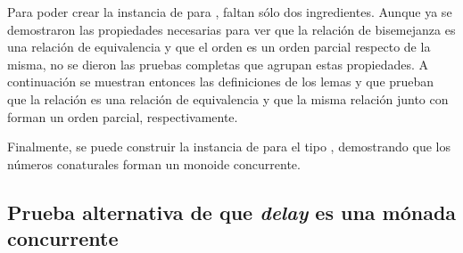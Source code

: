 Para poder crear la instancia de  para , faltan sólo dos ingredientes. Aunque ya se demostraron las propiedades necesarias para ver que la relación de bisemejanza es una relación de equivalencia y que el orden es un orden parcial respecto de la misma, no se dieron las pruebas completas que agrupan estas propiedades. A continuación se muestran entonces las definiciones de los lemas  y  que prueban que la relación \AgdaFunction{[ $\infty$ ]\_$\sim$\_} es una relación de equivalencia y que la misma relación junto con \AgdaFunction{[ $\infty$ ]\_$\leq$\_} forman un orden parcial, respectivamente.

Finalmente, se puede construir la instancia de  para el tipo , demostrando que los números conaturales forman un monoide concurrente. 

\subsection{Prueba alternativa de que \textit{delay} es una mónada concurrente}

